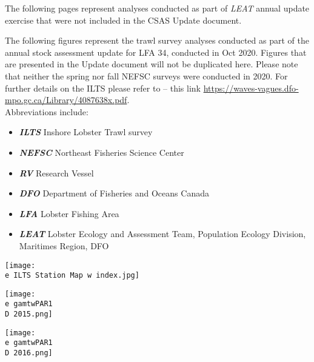 \documentclass[11pt]{article}
\newcommand{\D}{.}
\newcommand{\e}{/SpinDr/backup/bio_data/bio.lobster/figures/LFA34Update/} %
\begin{document}
\begin{titlepage}

The following pages represent analyses conducted as part of \emph{LEAT} annual update exercise that were not included in the CSAS Update document.





\end{titlepage}
The following figures represent the trawl survey analyses conducted as part of the annual stock assessment update for LFA 34, conducted in Oct 2020. Figures that are presented in the Update document will not be duplicated here. Please note that neither the spring nor fall NEFSC surveys were conducted in 2020. For further details on the ILTS please refer to -- this link \href{https://waves-vagues.dfo-mpo.gc.ca/Library/4087638x.pdf}{https://waves-vagues.dfo-mpo.gc.ca/Library/4087638x.pdf}.\\
Abbreviations include:
\begin{itemize}
\item{\bf{\emph{ILTS}}} Inshore Lobster Trawl survey 
\item{\bf{\emph{NEFSC}}} Northeast Fisheries Science Center
\item{\bf{\emph{RV}}} Research Vessel 
\item{\bf{\emph{DFO}}} Department of Fisheries and Oceans Canada
\item{\bf{\emph{LFA}}} Lobster Fishing Area
\item{\bf{\emph{LEAT}}} Lobster Ecology and Assessment Team, Population Ecology Division, Maritimes Region, DFO


\end{itemize}
\center
\texttt{[image: \\e ILTS Station Map w index.jpg]}\\


\texttt{[image: \\e gamtwPAR1\\D 2015.png]}\\

\texttt{[image: \\e gamtwPAR1\\D 2016.png]}\\
\end{document}
